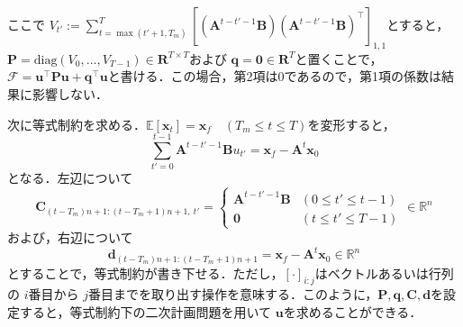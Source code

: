 \documentclass[titlepage]{ltjsbook}
\begin{document}
ここで $V_{t'}:=\sum_{t=\max(t'+1, T_m)}^{T} \left[\left(\mathbf{A}^{t-t'-1} \mathbf{B}\right)\left(\mathbf{A}^{t-t'-1} \mathbf{B}\right)^{\top} \right]_{1,1}$とすると，$\mathbf{P}=\mathrm{diag}(V_0, \ldots, V_{T-1})\in \mathbf{R}^{T\times T}$および $\mathbf{q}=\mathbf{0} \in \mathbf{R}^{T}$と置くことで，$\mathcal{F}=\mathbf{u}^\top \mathbf{P}\mathbf{u}+\mathbf{q} ^{\top}\mathbf{u}$と書ける．この場合，第2項は0であるので，第1項の係数は結果に影響しない．

次に等式制約を求める．$\mathbb{E}\left[\mathbf{x}_{t}\right] = \mathbf{x}_f\quad (T_m\leq t \leq T)$を変形すると，
\begin{equation}
\sum_{t'=0}^{t-1} \mathbf{A}^{t-t'-1} \mathbf{B} u_{t'}=\mathbf{x}_f-\mathbf{A}^{t} \mathbf{x}_{0}
\end{equation}
となる．左辺について
\begin{equation}
\mathbf{C}_{(t-T_m)n+1:(t-T_m+1)n+1,\ t'}=
\begin{cases}
    \mathbf{A}^{t-t'-1} \mathbf{B} & (0\leq t'\leq t-1) \\
    \mathbf{0} & (t\leq t'\leq T-1)
\end{cases}\in \mathbb{R}^n 
\end{equation}
および，右辺について
\begin{equation}
\mathbf{d}_{(t-T_m)n+1:(t-T_m+1)n+1}=\mathbf{x}_f-\mathbf{A}^{t} \mathbf{x}_{0} \in \mathbb{R}^n 
\end{equation}
とすることで，等式制約が書き下せる．ただし，$[\cdot]_{i:j}$はベクトルあるいは行列の $i$番目から $j$番目までを取り出す操作を意味する．このように，$\mathbf{P}, \mathbf{q}, \mathbf{C}, \mathbf{d}$を設定すると，等式制約下の二次計画問題を用いて $\mathbf{u}$を求めることができる．

\printbibliography[segment=\therefsegment,heading=subbibliography,title={参考文献}]
\end{document}
